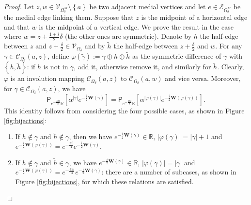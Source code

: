 \documentclass[oneside,english]{amsart}
\numberwithin{equation}{section}
\numberwithin{figure}{section}
\theoremstyle{plain}
\theoremstyle{plain}
\theoremstyle{plain}
\theoremstyle{plain}
\theoremstyle{plain}
\theoremstyle{definition}
\theoremstyle{remark}
\begin{document}
\begin{proof}
Let $z,w\in\mathcal{V}_{\Omega_{\delta}^{M}}\setminus\left\{ a\right\} $
be two adjacent medial vertices and let $e\in\mathcal{E}_{\Omega_{\delta}^{M}}$
be the medial edge linking them. Suppose that $z$ is the midpoint
of a horizontal edge and that $w$ is the midpoint of a vertical edge.
We prove the result in the case where $w=z+\frac{1+i}{2}\delta$ (the
other ones are symmetric). Denote by $h$ the half-edge between $z$
and $z+\frac{\delta}{2}\in\mathcal{V}_{\Omega_{\delta}}$ and by $\tilde{h}$
the half-edge between $z+\frac{\delta}{2}$ and $w$. For any $\gamma\in\mathcal{C}_{\Omega_{\delta}}\left(a,z\right)$,
define $\varphi\left(\tilde{\gamma}\right):=\gamma\oplus h\oplus\tilde{h}$
as the symmetric difference of $\gamma$ with $\left\{ h,\tilde{h}\right\} $:
if $h$ is not in $\gamma$, add it, otherwise remove it, and similarly
for $\tilde{h}$. Clearly, $\varphi$ is an involution mapping $\mathcal{C}_{\Omega_{\delta}}\left(a,z\right)$
to $\mathcal{C}_{\Omega_{\delta}}\left(a,w\right)$ and vice versa.
Moreover, for $\gamma\in\mathcal{C}_{\Omega_{\delta}}\left(a,z\right)$,
we have 
\begin{equation}
\mathsf{P}_{e^{-\frac{3\pi i}{8}}\mathbb{R}}\left[\alpha^{\left|\gamma\right|}e^{-\frac{i}{2}\mathbf{W}\left(\gamma\right)}\right]=\mathsf{P}_{e^{-\frac{3\pi i}{8}}\mathbb{R}}\left[\alpha^{\left|\varphi\left(\gamma\right)\right|}e^{-\frac{i}{2}\mathbf{W}\left(\varphi\left(\gamma\right)\right)}\right].\label{eq:bijection-proj}
\end{equation}
This identity follows from considering the four possible cases, as
shown in Figure \ref{fig:bijections}:
\begin{enumerate}
\item If $h\notin\gamma$ and $\tilde{h}\notin\gamma$, then we have $e^{-\frac{i}{2}\mathbf{W}\left(\gamma\right)}\in\mathbb{R}$,
$\left|\varphi\left(\gamma\right)\right|=\left|\gamma\right|+1$ and
$e^{-\frac{i}{2}\mathbf{W}\left(\varphi\left(\gamma\right)\right)}=e^{-\frac{\pi i}{4}}e^{-\frac{i}{2}\mathbf{W}\left(\gamma\right)}$.
\item If $h\notin\gamma$ and $\tilde{h}\in\gamma$, we have $e^{-\frac{i}{2}\mathbf{W}\left(\gamma\right)}\in\mathbb{R}$,
$\left|\varphi\left(\gamma\right)\right|=\left|\gamma\right|$ and
$e^{-\frac{i}{2}\mathbf{W}\left(\varphi\left(\gamma\right)\right)}=e^{-\frac{3\pi i}{4}}e^{-\frac{i}{2}\mathbf{W}\left(\gamma\right)}$:
there are a number of subcases, as shown in Figure \ref{fig:bijections},
for which these relations are satisfied.

\end{enumerate}
\end{proof}
\end{document}

